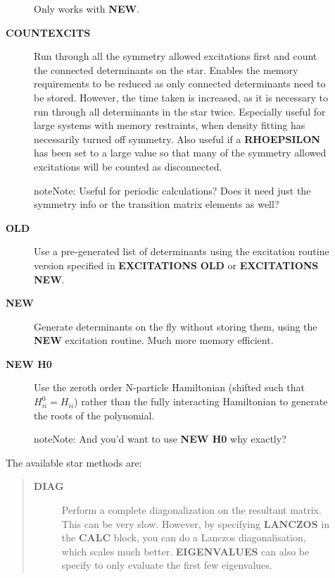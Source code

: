 \documentclass[openany,a4paper,10pt,english]{manual}
\begin{document}
\begin{description}
\begin{description}
Only works with \textbf{NEW}.

\item[\textbf{COUNTEXCITS}] \leavevmode
Run through all the symmetry allowed excitations
first and count the connected determinants on the star.  Enables the
memory requirements to be reduced as only connected determinants need
to be stored. However, the time taken is increased, as it is necessary
to run through all determinants in the star twice. Especially useful
for large systems with memory restraints, when density fitting has
necessarily turned off symmetry. Also useful if a \textbf{RHOEPSILON}
has been set to a large value so that many of the symmetry allowed
excitations  will be counted as disconnected.

\begin{notice}{note}{Note:}
Useful for periodic calculations?  Does it need just the
symmetry info or the transition matrix elements as well?
\end{notice}

\item[\textbf{OLD}] \leavevmode
Use a pre-generated list of determinants using the excitation
routine version specified in \textbf{EXCITATIONS} \textbf{OLD} or
\textbf{EXCITATIONS} \textbf{NEW}.

\item[\textbf{NEW}] \leavevmode
Generate determinants on the fly without storing them, using
the \textbf{NEW} excitation routine.  Much more memory efficient.

\item[\textbf{NEW H0}] \leavevmode
Use the zeroth order N-particle Hamiltonian (shifted such that
$H^0_{ii} = H_{ii}$) rather than the fully interacting
Hamiltonian to generate the roots of the polynomial.

\begin{notice}{note}{Note:}
And you'd want to use \textbf{NEW H0} why exactly?
\end{notice}

\end{description}

The available star methods are:
\begin{quote}
\begin{description}
\item[\textbf{DIAG}] \leavevmode
Perform a complete diagonalization on the resultant matrix.  This can
be very slow. However, by specifying \textbf{LANCZOS} in the \textbf{CALC}
block, you can do a Lanczos diagonalisation, which scales much
better. \textbf{EIGENVALUES} can also be specify to only evaluate the
first few eigenvalues.


\end{description}
\end{quote}
\end{description}
\end{document}
